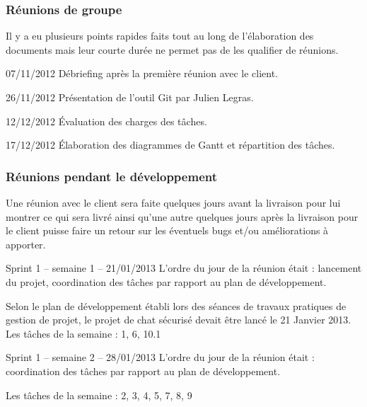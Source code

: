\documentclass[a4paper,11pt,french]{article}
\begin{document}
\subsubsection{Réunions de groupe}
Il y a eu plusieurs points rapides faits tout au long de l'élaboration des documents mais leur courte durée ne permet pas de les qualifier de réunions.

\begin{paragraph}{07/11/2012}
Débriefing après la première réunion avec le client.
\end{paragraph}

\begin{paragraph}{26/11/2012}
Présentation de l'outil Git par Julien Legras.
\end{paragraph}

\begin{paragraph}{12/12/2012}
Évaluation des charges des tâches.
\end{paragraph}

\begin{paragraph}{17/12/2012}
Élaboration des diagrammes de Gantt et répartition des tâches.
\end{paragraph}

\subsubsection{Réunions pendant le développement}
Une réunion avec le client sera faite quelques jours avant la livraison pour lui montrer ce qui sera livré ainsi qu'une autre quelques jours après la livraison pour le client puisse faire un retour sur les éventuels bugs et/ou améliorations à apporter.

\begin{paragraph}{Sprint 1 -- semaine 1 -- 21/01/2013}
L’ordre du jour de la réunion était : lancement du projet, coordination des tâches par rapport au plan de développement.

Selon le plan de développement établi lors des séances de travaux pratiques de gestion de projet, le projet de chat sécurisé devait être lancé le 21 Janvier 2013. Les tâches de la semaine : 1, 6, 10.1
\end{paragraph}

\begin{paragraph}{Sprint 1 -- semaine 2 -- 28/01/2013}
L’ordre du jour de la réunion était : coordination des tâches par rapport au plan de développement.

Les tâches de la semaine : 2, 3, 4, 5, 7, 8, 9
\end{paragraph}
\end{document}
